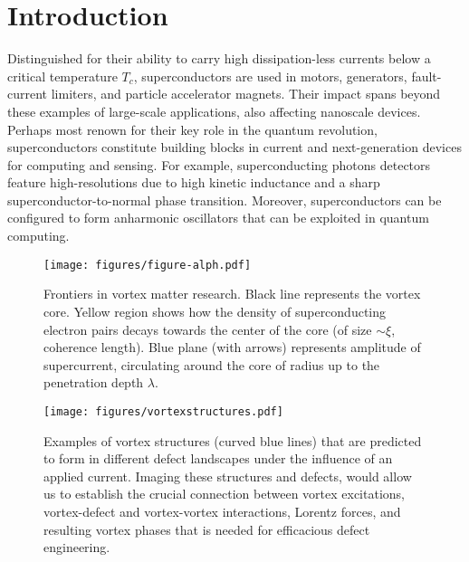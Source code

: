 \documentclass[%
 aip,
 amsmath,amssymb,
 reprint,%
floatfix]{revtex4-1}
\newcommand{\Tc}{T_{c}}
\begin{document}
\maketitle

\section{\label{sec:Introduction}Introduction}

Distinguished for their ability to carry high dissipation-less currents below a critical temperature $\Tc$, superconductors are used in motors, generators, fault-current limiters, and particle accelerator magnets. Their impact spans beyond these examples of large-scale applications, also affecting nanoscale devices. Perhaps most renown for their key role in the quantum revolution, superconductors constitute building blocks in current and next-generation devices for computing and sensing.  For example, superconducting photons detectors feature high-resolutions due to high kinetic inductance and a sharp superconductor-to-normal phase transition. Moreover, superconductors can be configured to form anharmonic oscillators that can be exploited in quantum computing. 

%
\begin{figure}[ht]
\texttt{[image: figures/figure-alph.pdf]}
\caption{Frontiers in vortex matter research. Black line represents the vortex core. Yellow region shows how the density of superconducting electron pairs decays towards the center of the core (of size $\sim \xi$, coherence length). Blue plane (with arrows) represents amplitude of supercurrent, circulating around the core of radius up to the penetration depth $\lambda$.
\label{fig:summary}
}
\end{figure}
%

%
\begin{figure}[htp]
\texttt{[image: figures/vortexstructures.pdf]}
\caption{\label{fig:vortexstructures} Examples of vortex structures (curved blue lines) that are predicted to form in different defect landscapes under the influence of an applied current. Imaging these structures and defects, would allow us to establish the crucial connection between vortex excitations, vortex-defect and vortex-vortex interactions, Lorentz forces, and resulting vortex phases that is needed for efficacious defect engineering.}
\end{figure}
%
\end{document}
